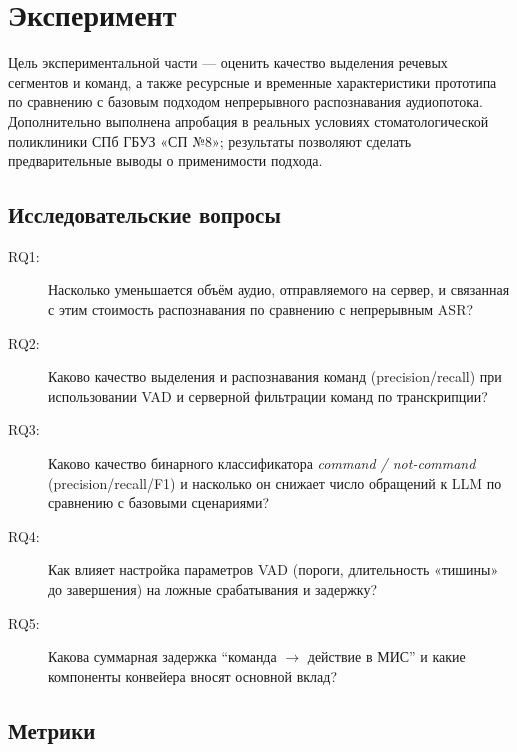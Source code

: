 
\clearpage
\section{Эксперимент}
\label{sec:experiment}

Цель экспериментальной части --- оценить качество выделения речевых сегментов и команд, а также ресурсные и временные характеристики прототипа по сравнению с базовым подходом непрерывного распознавания аудиопотока.
Дополнительно выполнена апробация в реальных условиях стоматологической поликлиники СПб ГБУЗ «СП №8»; результаты позволяют сделать предварительные выводы о применимости подхода.

\subsection{Исследовательские вопросы}
\label{subsec:exp_rq}

\begin{description}
    \item[RQ1:] Насколько уменьшается объём аудио, отправляемого на сервер, и связанная с этим стоимость распознавания по сравнению с непрерывным ASR?
    \item[RQ2:] Каково качество выделения и распознавания команд (precision/recall) при использовании VAD и серверной фильтрации команд по транскрипции?
    \item[RQ3:] Каково качество бинарного классификатора \textit{command / not-command} (precision/recall/F1) и насколько он снижает число обращений к LLM по сравнению с базовыми сценариями?
    \item[RQ4:] Как влияет настройка параметров VAD (пороги, длительность «тишины» до завершения) на ложные срабатывания и задержку?
    \item[RQ5:] Какова суммарная задержка \enquote{команда $\rightarrow$ действие в МИС} и какие компоненты конвейера вносят основной вклад?
\end{description}

\subsection{Метрики}
\label{subsec:exp_metrics}

